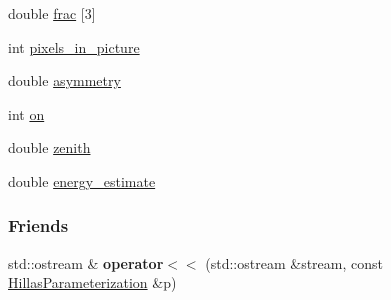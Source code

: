 \begin{DoxyCompactItemize}
\item 
\hypertarget{structHillasParameterization_acd0f28b7341a288c0aec029f85610247}{
double \hyperlink{structHillasParameterization_acd0f28b7341a288c0aec029f85610247}{frac} \mbox{[}3\mbox{]}}
\label{structHillasParameterization_acd0f28b7341a288c0aec029f85610247}

\item 
\hypertarget{structHillasParameterization_a973a0f8fbe33182e15cf8d585dba5657}{
int \hyperlink{structHillasParameterization_a973a0f8fbe33182e15cf8d585dba5657}{pixels\_\-in\_\-picture}}
\label{structHillasParameterization_a973a0f8fbe33182e15cf8d585dba5657}

\item 
\hypertarget{structHillasParameterization_aefb1906b72858ad355eac40bfc0f313b}{
double \hyperlink{structHillasParameterization_aefb1906b72858ad355eac40bfc0f313b}{asymmetry}}
\label{structHillasParameterization_aefb1906b72858ad355eac40bfc0f313b}

\item 
\hypertarget{structHillasParameterization_a8a07467067d17d6430677bcae47b3c58}{
int \hyperlink{structHillasParameterization_a8a07467067d17d6430677bcae47b3c58}{on}}
\label{structHillasParameterization_a8a07467067d17d6430677bcae47b3c58}

\item 
\hypertarget{structHillasParameterization_aa9e06ca0a327df412ce4b314e0e8a093}{
double \hyperlink{structHillasParameterization_aa9e06ca0a327df412ce4b314e0e8a093}{zenith}}
\label{structHillasParameterization_aa9e06ca0a327df412ce4b314e0e8a093}

\item 
\hypertarget{structHillasParameterization_aaa67bb030d146dca24a4ef045b4ad1d2}{
double \hyperlink{structHillasParameterization_aaa67bb030d146dca24a4ef045b4ad1d2}{energy\_\-estimate}}
\label{structHillasParameterization_aaa67bb030d146dca24a4ef045b4ad1d2}

\end{DoxyCompactItemize}
\subsubsection*{Friends}
\begin{DoxyCompactItemize}
\item 
\hypertarget{structHillasParameterization_a2a0dbb088d9df8f10a6ac85f171cdab0}{
std::ostream \& {\bfseries operator$<$$<$} (std::ostream \&stream, const \hyperlink{structHillasParameterization}{HillasParameterization} \&p)}
\label{structHillasParameterization_a2a0dbb088d9df8f10a6ac85f171cdab0}

\end{DoxyCompactItemize}


